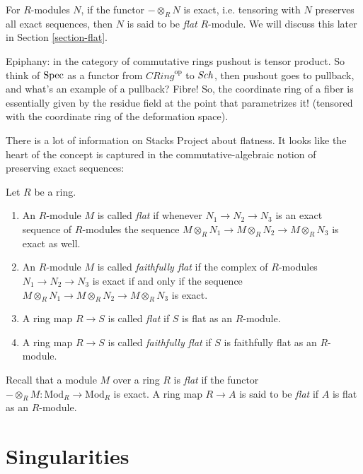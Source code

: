 \begin{definition}
\label{definition-flat-module}
For $R$-modules $N$, if the
functor $-\otimes_R N$ is exact, i.e. tensoring
with $N$ preserves all exact
sequences, then $N$ is said to be {\it flat} $R$-module.
We will discuss this later in Section \ref{section-flat}.
\end{definition}

\medskip\noindent
Epiphany:
in the category of commutative rings
pushout is tensor product.
So think of $\mathop{\mathrm{Spec}} $ as a functor
from $\mathit{CRing}^{\text{op}}$ to $\mathit{Sch}$,
then pushout goes to pullback,
and what's an example of a pullback?
Fibre!
So, the coordinate ring of a fiber
is essentially given by the residue field
at the point that parametrizes it!
(tensored with the coordinate ring
of the deformation space).

There is a lot of information on Stacks Project about flatness.
It looks like the heart of the concept is 
captured in the commutative-algebraic notion of preserving
exact sequences:

\begin{definition}
\label{definition-flat}
Let $R$ be a ring.
\begin{enumerate}
\item An $R$-module $M$ is called {\it flat} if whenever
$N_1 \to N_2 \to N_3$ is an exact sequence of $R$-modules
the sequence $M \otimes_R N_1 \to M \otimes_R N_2 \to M \otimes_R N_3$
is exact as well.
\item An $R$-module $M$ is called {\it faithfully flat} if the
complex of $R$-modules
$N_1 \to N_2 \to N_3$ is exact if and only if
the sequence $M \otimes_R N_1 \to M \otimes_R N_2 \to M \otimes_R N_3$
is exact.
\item A ring map $R \to S$ is called {\it flat} if
$S$ is flat as an $R$-module.
\item A ring map $R \to S$ is called {\it faithfully flat} if
$S$ is faithfully flat as an $R$-module.
\end{enumerate}
\end{definition}

\medskip\noindent
Recall that a module $M$ over a ring $R$ is {\it flat} if the functor
$-\otimes_R M : \text{Mod}_R \to \text{Mod}_R$ is exact. A ring map
$R \to A$ is said to be {\it flat} if $A$ is flat as an $R$-module.

\section{Singularities}
\label{section-singularities}

